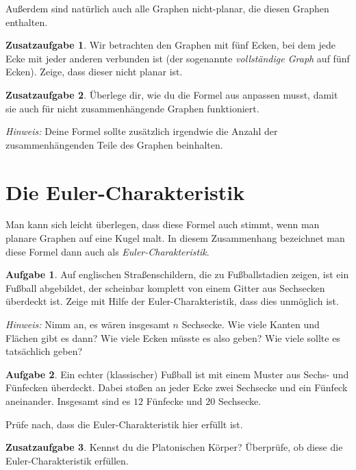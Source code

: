 \documentclass[a4paper,ngerman,12pt]{scrartcl}
\theoremstyle{definition}
\newtheorem{aufg}{Aufgabe}
\newtheorem{zaufg}{Zusatzaufgabe}
\theoremstyle{plain}
\theoremstyle{remark}
\begin{document}
Außerdem sind natürlich auch alle Graphen nicht-planar, die diesen Graphen enthalten.

\begin{zaufg}
	Wir betrachten den Graphen mit fünf Ecken, bei dem jede Ecke mit jeder anderen verbunden ist (der sogenannte \emph{vollständige Graph} auf fünf Ecken). Zeige, dass dieser nicht planar ist.
\end{zaufg}

\begin{zaufg}
	Überlege dir, wie du die Formel aus  anpassen musst, damit sie auch für nicht zusammenhängende Graphen funktioniert.
	
	\textit{Hinweis:} Deine Formel sollte zusätzlich irgendwie die Anzahl der zusammenhängenden Teile des Graphen beinhalten.
\end{zaufg}

\section{Die Euler-Charakteristik}

Man kann sich leicht überlegen, dass diese Formel auch stimmt, wenn man planare Graphen auf eine Kugel malt. In diesem Zusammenhang bezeichnet man diese Formel dann auch als \emph{Euler-Charakteristik}.

\begin{aufg}
	Auf englischen Straßenschildern, die zu Fußballstadien zeigen, ist ein Fußball abgebildet, der scheinbar komplett von einem Gitter aus Sechsecken überdeckt ist. Zeige mit Hilfe der Euler-Charakteristik, dass dies unmöglich ist.
	
	\textit{Hinweis:} Nimm an, es wären insgesamt $n$ Sechsecke. Wie viele Kanten und Flächen gibt es dann? Wie viele Ecken müsste es also geben? Wie viele sollte es tatsächlich geben?
\end{aufg}

\begin{aufg}
	Ein echter (klassischer) Fußball ist mit einem Muster aus Sechs- und Fünfecken überdeckt. Dabei stoßen an jeder Ecke zwei Sechsecke und ein Fünfeck aneinander. Insgesamt sind es $12$ Fünfecke und $20$ Sechsecke. 
	
	Prüfe nach, dass die Euler-Charakteristik hier erfüllt ist.
\end{aufg}

\begin{zaufg}
	Kennst du die Platonischen Körper? Überprüfe, ob diese die Euler-Charakteristik erfüllen.
\end{zaufg}
\end{document}
